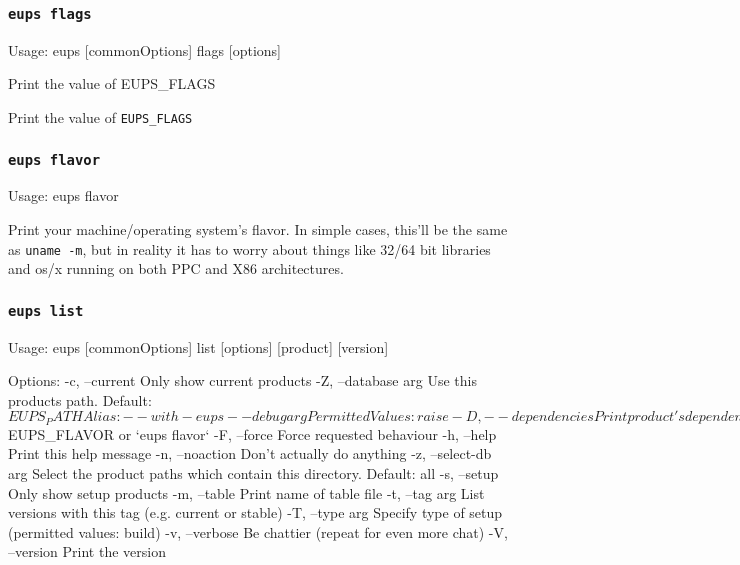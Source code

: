 \documentclass{article}
\newcommand{\code}[1]{\texttt{#1}}
\let\overbatim=\verbatim
\let\oendverbatim=\endverbatim
\renewenvironment{verbatim}
{\center\minipage{16cm}\overbatim}
{\oendverbatim\endminipage\endcenter}
\begin{document}

\subsubsection{\code{eups flags}}
\begin{verbatim}
Usage:
    eups [commonOptions] flags [options]

Print the value of EUPS_FLAGS
\end{verbatim}
  
Print the value of \code{EUPS\_FLAGS}


\subsubsection{\code{eups flavor}}
\begin{verbatim}
Usage:
   eups flavor
\end{verbatim}
  
Print your machine/operating system's flavor.  In simple cases, this'll
be the same as \code{uname -m}, but in reality it has to worry about things
like 32/64 bit libraries and os/x running on both PPC and X86 architectures.


\subsubsection{\code{eups list}}
\begin{verbatim}
Usage:
    eups [commonOptions] list [options] [product] [version]

Options:
   -c, --current           Only show current products
   -Z, --database   arg    Use this products path. Default: $EUPS_PATH
                           Alias: --with-eups
       --debug      arg    Permitted Values: raise
   -D, --dependencies      Print product's dependencies
       --depth      arg    Only list this many layers of dependency
   -d, --directory         Print product directory
   -e, --exact             Use the as-installed version, not the conditional in the table file
   -f, --flavor     arg    Use this flavor. Default: $EUPS_FLAVOR or `eups flavor`
   -F, --force             Force requested behaviour
   -h, --help              Print this help message
   -n, --noaction          Don't actually do anything
   -z, --select-db  arg    Select the product paths which contain this directory.
                           Default: all
   -s, --setup             Only show setup products
   -m, --table             Print name of table file
   -t, --tag        arg    List versions with this tag (e.g. current or stable)
   -T, --type       arg    Specify type of setup (permitted values: build)
   -v, --verbose           Be chattier (repeat for even more chat)
   -V, --version           Print the version
\end{verbatim}
\end{document}
